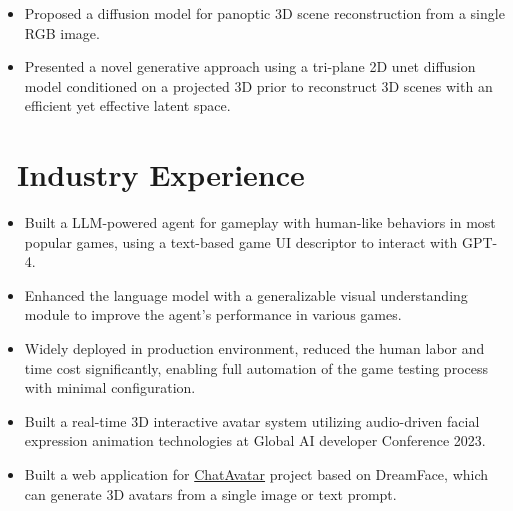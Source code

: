 \documentclass{resume}
\begin{document}

\begin{itemize}
  \item Proposed a diffusion model for panoptic 3D scene reconstruction from a single RGB image.
  \item Presented a novel generative approach using a tri-plane 2D unet diffusion model conditioned on a projected 3D prior to reconstruct 3D scenes with an efficient yet effective latent space.
\end{itemize}

\section{\faUsers\ Industry Experience}


\begin{itemize}
  \item Built a LLM-powered agent for gameplay with human-like behaviors in most popular games, using a text-based game UI descriptor to interact with GPT-4.
  \item Enhanced the language model with a generalizable visual understanding module to improve the agent's performance in various games.
  \item Widely deployed in production environment, reduced the human labor and time cost significantly, enabling full automation of the game testing process with minimal configuration.
\end{itemize}
\vspace{-0.5em}


\begin{itemize}
  \item Built a real-time 3D interactive avatar system utilizing audio-driven facial expression animation technologies at Global AI developer Conference 2023.
  \item Built a web application for \href{https://hyperhuman.deemos.com/}{ChatAvatar} project based on DreamFace\cite{zhang2023dreamface}, which can generate 3D avatars from a single image or text prompt.
\end{itemize}
\vspace{-0.5em}
\end{document}
